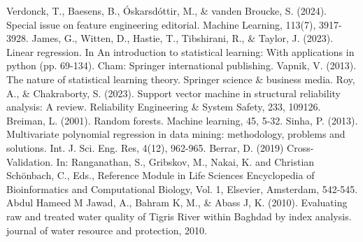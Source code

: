 \documentclass[12pt,a4paper]{article}
\begin{document}
\begin{enumerate}
\begin{thebibliography}{99}
 Verdonck, T., Baesens, B., Óskarsdóttir, M., \& vanden Broucke, S. (2024). Special issue on feature engineering editorial. Machine Learning, 113(7), 3917-3928.
 James, G., Witten, D., Hastie, T., Tibshirani, R., \& Taylor, J. (2023). Linear regression. In An introduction to statistical learning: With applications in python (pp. 69-134). Cham: Springer international publishing.
 Vapnik, V. (2013). The nature of statistical learning theory. Springer science \& business media.
 Roy, A., \& Chakraborty, S. (2023). Support vector machine in structural reliability analysis: A review. Reliability Engineering \& System Safety, 233, 109126.
 Breiman, L. (2001). Random forests. Machine learning, 45, 5-32.
 Sinha, P. (2013). Multivariate polynomial regression in data mining: methodology, problems and solutions. Int. J. Sci. Eng. Res, 4(12), 962-965.
 Berrar, D. (2019) Cross-Validation. In: Ranganathan, S., Gribskov, M., Nakai, K. and Christian Schönbach, C., Eds., Reference Module in Life Sciences Encyclopedia of Bioinformatics and Computational Biology, Vol. 1, Elsevier, Amsterdam, 542-545.
 Abdul Hameed M Jawad, A., Bahram K, M., \& Abass J, K. (2010). Evaluating raw and treated water quality of Tigris River within Baghdad by index analysis. journal of water resource and protection, 2010.

\end{thebibliography}

\end{enumerate}	

\label{LastPage}
\end{document}
